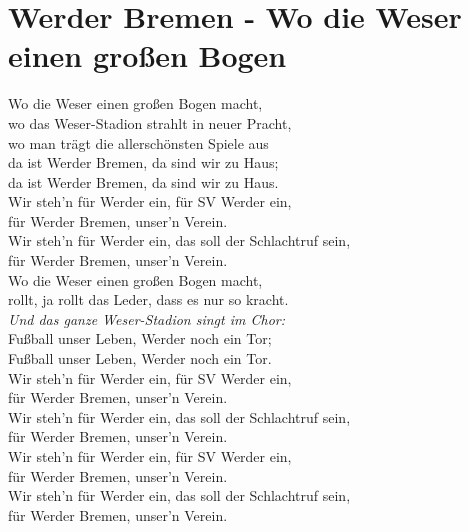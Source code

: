 \documentclass[twoside,8pt]{scrartcl}
\begin{document}
\section{Werder Bremen - Wo die Weser einen großen Bogen}
Wo die Weser einen großen Bogen macht, \\
wo das Weser-Stadion strahlt in neuer Pracht, \\
wo man trägt die allerschönsten Spiele aus \\
da ist Werder Bremen, da sind wir zu Haus; \\
da ist Werder Bremen, da sind wir zu Haus. \\
\newline
Wir steh'n für Werder ein, für SV Werder ein, \\
für Werder Bremen, unser'n Verein. \\
Wir steh'n für Werder ein, das soll der Schlachtruf sein, \\
für Werder Bremen, unser'n Verein. \\
\newline
Wo die Weser einen großen Bogen macht, \\
rollt, ja rollt das Leder, dass es nur so kracht. \\
\newline
\textit{Und das ganze Weser-Stadion singt im Chor:} \\
\newline
Fußball unser Leben, Werder noch ein Tor; \\
Fußball unser Leben, Werder noch ein Tor. \\
\newline
Wir steh'n für Werder ein, für SV Werder ein, \\
für Werder Bremen, unser'n Verein. \\
Wir steh'n für Werder ein, das soll der Schlachtruf sein, \\
für Werder Bremen, unser'n Verein. \\
\newline
Wir steh'n für Werder ein, für SV Werder ein, \\
für Werder Bremen, unser'n Verein. \\
Wir steh'n für Werder ein, das soll der Schlachtruf sein, \\
für Werder Bremen, unser'n Verein.\\
\clearpage
\end{document}
